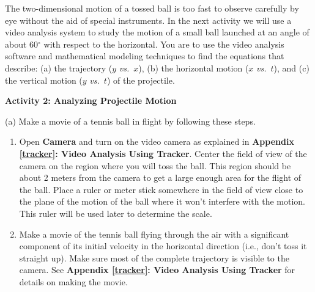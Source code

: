 The two-dimensional motion of a tossed ball is too fast to observe carefully
by eye without the aid of special instruments. In the next activity we will
use a video analysis system to study the motion of a small ball launched at
an angle of about 60\( ^{\circ } \) with respect to the horizontal. You are
to use the video analysis software and mathematical modeling techniques to find
the equations that describe: (a) the trajectory ($y$ \textit{vs.}~$x$), 
(b) the horizontal
motion ($x$ \textit{vs.}~$t$), and (c) the vertical motion ($y$ \textit{vs.}~$t$) of the projectile.

\newpage
\textbf{Activity 2: Analyzing Projectile Motion} 

(a) Make a movie of a tennis ball in flight by following these steps. 

\begin{enumerate}
\item Open \textbf{Camera} and turn on the video camera as explained in \textbf{Appendix \ref{tracker}: Video Analysis Using Tracker}. Center the field of view of the camera on the region where you will toss the ball. This region should be about 2 meters from the camera to
get a large enough area for the flight of the ball. Place a ruler or meter stick
somewhere in the field of view close to the plane of the motion of the ball
where it won't interfere with the motion. This ruler will be used later to determine the scale. 
\item Make a movie of the tennis ball flying through the air with a significant component
of its initial velocity in the horizontal direction (i.e., don't toss it straight
up). Make sure most of the complete trajectory is visible to the camera. See
\textbf{Appendix \ref{tracker}: Video Analysis Using Tracker} for details on making the movie. 

\end{enumerate}
